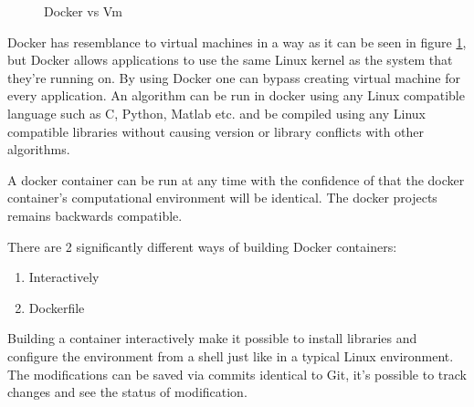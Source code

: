 \begin{figure}[bth]
    \centering
    \qquad
    \caption{Docker vs Vm}
    \label{fig:dockervm}
\end{figure}

Docker has resemblance to virtual machines in a way as it can be seen in figure \ref{fig:dockervm}, but Docker allows applications to use the same Linux kernel as the system that they’re running on. By using Docker one can bypass creating virtual machine for every application. 
An algorithm can be run in docker using any Linux compatible language such as C, Python, Matlab etc. and be compiled using any Linux compatible libraries without causing version or library conflicts with other algorithms.

A docker container can be run at any time with the confidence of that the docker container’s computational environment will be identical. The docker projects remains backwards compatible. 


There are 2 significantly different ways of building Docker containers:

\begin{enumerate}
	\item Interactively
	\item Dockerfile
\end{enumerate} 

Building a container interactively make it possible to install libraries and configure the environment from a shell just like in a typical Linux environment. The modifications can be saved via commits identical to Git, it’s possible to track changes and see the status of modification.\\  

